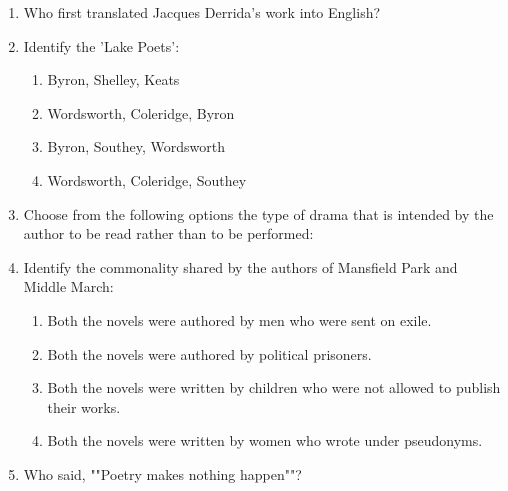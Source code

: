 \documentclass[12pt]{article}
\theoremstyle{remark}
\begin{document}
\begin{enumerate}
\hfill{}
\item Who first translated Jacques Derrida's work into English? 
\begin{enumerate}  \end{enumerate}
\hfill{}
\item Identify the 'Lake Poets': 
\begin{enumerate} 
\item Byron, Shelley, Keats 
\item Wordsworth, Coleridge, Byron 
\item Byron, Southey, Wordsworth 
\item Wordsworth, Coleridge, Southey 
\end{enumerate}
\hfill{}
\item Choose from the following options the type of drama that is intended by the
author to be read rather than to be performed: 
\begin{enumerate}  \end{enumerate}
\hfill{}
\item Identify the commonality shared by the authors of Mansfield Park and Middle
March: 
\begin{enumerate} 
\item Both the novels were authored by men who were sent on exile. 
\item Both the novels were authored by political prisoners. 
\item Both the novels were written by children who were not allowed to publish their
works. 
\item Both the novels were written by women who wrote under pseudonyms. 
\end{enumerate}
\hfill{}
\item Who said, ""Poetry makes nothing happen""? 

\end{enumerate}
\end{document}

